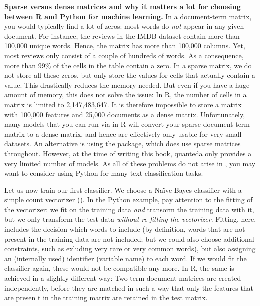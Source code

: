 \begin{feature}
  \textbf{Sparse versus dense matrices and why it matters a lot for
    choosing between R and Python for machine learning.} In a
  document-term matrix, you would typically find a lot of zeros: most
  words do \emph{not} appear in any given document. For instance, the
  reviews in the IMDB dataset contain more than 100,000 unique
  words. Hence, the matrix has more than 100,000 columns. Yet, most
  reviews only consist of a couple of hundreds of words. As a
  consequence, more than 99\% of the cells in the table contain a
  zero. In a sparse matrix, we do not store all these zeros, but only
  store the values for cells that actually contain a value. This
  drastically reduces the memory needed.  But even if you have a huge
  amount of memory, this does not solve the issue: In R, the number of
  cells in a matrix is limited to 2,147,483,647. It is therefore
  impossible to store a matrix with 100,000 features and 25,000
  documents as a dense matrix. Unfortunately, many models that you can
  run via  in R will convert your sparse document-term
  matrix to a dense matrix, and hence are effectively only usable for
  very small datasets. An alternative is using the  package,
  which does use sparse matrices throughout. However, at the time of
  writing this book, quanteda only provides a very limited number of
  models. As all of these problems do not arise in ,
  you may want to consider using Python for many text classification tasks.
\end{feature}


Let us now train our first classifier. We choose a Na\"ive Bayes
classifier with a simple count vectorizer ().  In
the Python example, pay attention to the fitting of the vectorizer: we
fit on the training data \emph{and} transorm the training data with
it, but we only transform the test data \emph{without re-fitting the
  vectorizer}. Fitting, here, includes the decision which words to
include (by definition, words that are not present in the training
data are not included; but we could also choose additional
constraints, such as exluding very rare or very common words), but
also assigning an (internally used) identifier (variable name) to each
word. If we would fit the classifier again, these would not be
compatible any more. In R, the same is achieved in a slightly
different way: Two term-document matrices are created independently,
before they are matched in such a way that only the features that are
presen t in the training matrix are retained in the test matrix.


